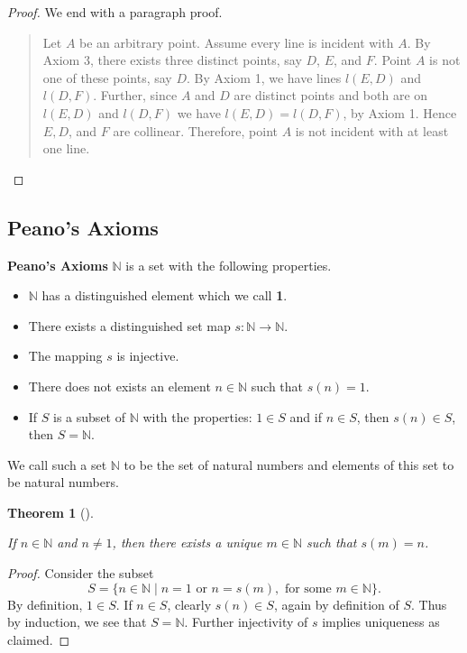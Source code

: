 \documentclass[
  letterpaper,
  10pt,
  reqno,
  twopage,
  openany]{book}
\providecommand{\tightlist}{%
  \setlength{\itemsep}{0pt}\setlength{\parskip}{0pt}}\usepackage{longtable,booktabs,array}
\theoremstyle{plain}
\theoremstyle{definition}
\theoremstyle{definition}
\theoremstyle{definition}
\theoremstyle{plain}
\theoremstyle{plain}
\newtheorem{theorem}{Theorem}[chapter]
\theoremstyle{remark}
\begin{document}
\begin{proof}
We end with a paragraph proof.

\begin{quote}
Let \(A\) be an arbitrary point. Assume every line is incident with
\(A\). By Axiom 3, there exists three distinct points, say \(D\), \(E\),
and \(F\). Point \(A\) is not one of these points, say \(D\). By Axiom
1, we have lines \(l(E,D)\) and \(l(D,F)\). Further, since \(A\) and
\(D\) are distinct points and both are on \(l(E,D)\) and \(l(D,F)\) we
have \(l(E,D)=l(D,F)\), by Axiom 1. Hence \(E, D\), and \(F\) are
collinear. Therefore, point \(A\) is not incident with at least one
line.
\end{quote}

\end{proof}

\hypertarget{peanos-axioms}{%
\subsection{Peano's Axioms}\label{peanos-axioms}}

\textbf{Peano's Axioms} \(\mathbb{N}\) is a set with the following
properties.

\begin{itemize}
\tightlist
\item
  \(\mathbb{N}\) has a distinguished element which we call \textbf{1}.
\item
  There exists a distinguished set map \(s: \mathbb{N} \to \mathbb{N}\).
\item
  The mapping \(s\) is injective.
\item
  There does not exists an element \(n\in \mathbb{N}\) such that
  \(s(n)=1\).
\item
  If \(S\) is a subset of \(\mathbb{N}\) with the properties: \(1\in S\)
  and if \(n\in S\), then \(s(n)\in S\), then \(S=\mathbb{N}\).
\end{itemize}

We call such a set \(\mathbb{N}\) to be the set of natural numbers and
elements of this set to be natural numbers.

\leavevmode{}%
\begin{theorem}[]\label{thm-wdef}

If \(n\in\mathbb{N}\) and \(n\neq 1\), then there exists a unique
\(m\in \mathbb{N}\) such that \(s(m)=n\).

\end{theorem}

\begin{proof}

Consider the subset \begin{equation}
S=\{n\in \mathbb{N} \mid n=1 \text{ or } n=s(m), \text{ for some } m\in \mathbb{N}\}.
\end{equation} By definition, \(1\in S\). If \(n\in S\), clearly
\(s(n)\in S\), again by definition of \(S\). Thus by induction, we see
that \(S=\mathbb{N}\). Further injectivity of \(s\) implies uniqueness
as claimed.

\end{proof}
\end{document}
